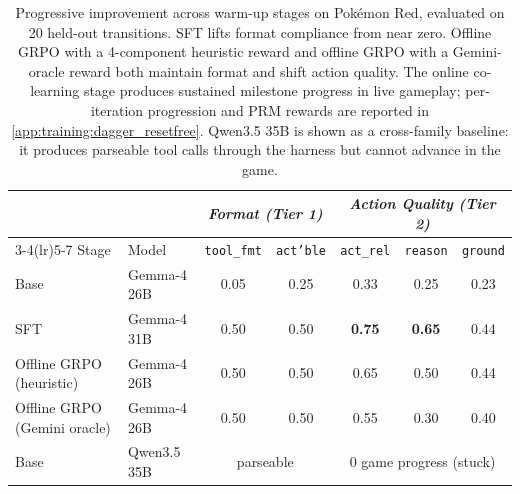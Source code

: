 %
\begin{table}[t]
\centering
\small
\caption{Progressive improvement across warm-up stages on Pok\'emon Red, evaluated on 20 held-out transitions. SFT lifts format compliance from near zero. Offline GRPO with a 4-component heuristic reward and offline GRPO with a Gemini-oracle reward both maintain format and shift action quality. The online co-learning stage produces sustained milestone progress in live gameplay; per-iteration progression and PRM rewards are reported in \cref{app:training:dagger_resetfree}. Qwen3.5 35B is shown as a cross-family baseline: it produces parseable tool calls through the harness but cannot advance in the game.}
\label{tab:h6_progression}
\begin{tabular}{llccccc}
\toprule
 & & \multicolumn{2}{c}{\textit{Format (Tier 1)}} & \multicolumn{3}{c}{\textit{Action Quality (Tier 2)}} \\
\cmidrule(lr){3-4}\cmidrule(lr){5-7}
Stage & Model & \texttt{tool\_fmt} & \texttt{act'ble} & \texttt{act\_rel} & \texttt{reason} & \texttt{ground} \\
\midrule
Base                          & Gemma-4 26B  & 0.05 & 0.25 & 0.33 & 0.25 & 0.23 \\
SFT                           & Gemma-4 31B  & 0.50 & 0.50 & \textbf{0.75} & \textbf{0.65} & 0.44 \\
Offline GRPO (heuristic)      & Gemma-4 26B  & 0.50 & 0.50 & 0.65 & 0.50 & 0.44 \\
Offline GRPO (Gemini oracle)  & Gemma-4 26B  & 0.50 & 0.50 & 0.55 & 0.30 & 0.40 \\
\midrule
Base                          & Qwen3.5 35B  & \multicolumn{2}{c}{parseable} & \multicolumn{3}{c}{0 game progress (stuck)} \\
\bottomrule
\end{tabular}
\end{table}
